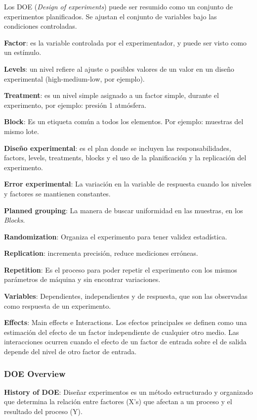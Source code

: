 \documentclass[]{article}
\begin{document}
Los DOE (\textit{Design of experiments}) puede ser resumido como un conjunto de experimentos planificados. Se ajustan el conjunto de variables bajo las condiciones controladas.

\textbf{Factor}: es la variable controlada por el experimentador, y puede ser visto como un estímulo.

\textbf{Levels}: un nivel refiere al ajuste o posibles valores de un valor en un diseño experimental (high-medium-low, por ejemplo).

\textbf{Treatment}: es un nivel simple asignado a un factor simple, durante el experimento, por ejemplo: presión 1 atmósfera.

\textbf{Block}: Es un etiqueta común a todos los elementos. Por ejemplo: muestras del mismo lote.

\textbf{Diseño experimental}: es el plan donde se incluyen las responsabilidades, factors, levels, treatments, blocks y el uso de la planificación y la replicación del experimento.

\textbf{Error experimental}: La variación en la variable de respuesta cuando los niveles y factores se mantienen constantes.

\textbf{Planned grouping}: La manera de buscar uniformidad en las muestras, en los \textit{Blocks}.

\textbf{Randomization}: Organiza el experimento para tener validez estadística.

\textbf{Replication}: incrementa precisión, reduce mediciones erróneas.

\textbf{Repetition}: Es el proceso para poder repetir el experimento con los mismos parámetros de máquina y sin encontrar variaciones.

\textbf{Variables}: Dependientes, independientes y de respuesta, que son las observadas como respuesta de un experimento.

\textbf{Effects}: Main effects e Interactions. Los efectos principales se definen como una estimación del efecto de un factor independiente de cualquier otro medio. Las interacciones ocurren cuando el efecto de un factor de entrada sobre el de salida depende del nivel de otro factor de entrada.

\subsubsection{DOE Overview}

\textbf{History of DOE}: Diseñar experimentos es un método estructurado y organizado que determina la relación entre factores (X's) que afectan a un proceso y el resultado del proceso (Y).
\end{document}
